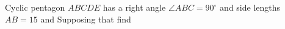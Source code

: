 Cyclic pentagon $ ABCDE$ has a right angle $ \angle{ABC} = 90^{\circ}$ and side lengths $ AB = 15$ and  Supposing that  find 